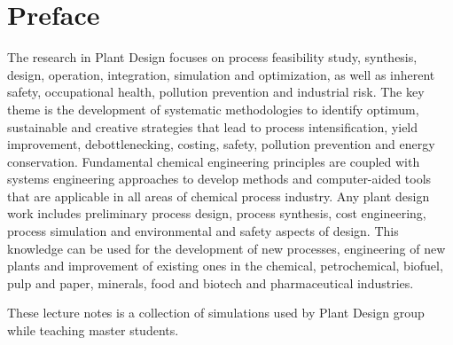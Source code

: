 \chapter*{Preface}

The research in Plant Design focuses on process feasibility study, synthesis, design, operation, integration, simulation and optimization, as well as  inherent safety, occupational health, pollution prevention and industrial risk. The key theme is the development of systematic methodologies to identify optimum, sustainable and creative strategies that lead to process intensification, yield improvement, debottlenecking, costing, safety, pollution prevention and energy conservation. Fundamental chemical engineering principles are coupled with systems engineering approaches to develop methods and computer-aided tools that are applicable in all areas of chemical process industry. Any plant design work includes preliminary process design, process synthesis, cost engineering, process simulation and environmental and safety aspects of design. This knowledge can be used for the development of new processes, engineering of new plants and improvement of existing ones in the chemical, petrochemical, biofuel, pulp and paper, minerals, food and biotech and pharmaceutical industries.

These lecture notes is a collection of simulations used by Plant Design group while teaching master students.
